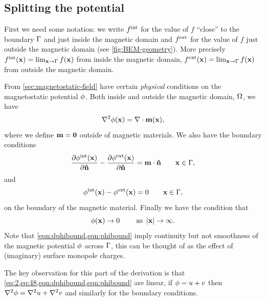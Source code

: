 \subsection{Splitting the potential}
\label{sec:problem-description}
\newcommand{\examplepot}{f}

First we need some notation: we write $\examplepot^\inte$ for the value of $\examplepot$ ``close'' to the boundary ${\Gamma}$ and just inside the magnetic domain and $\examplepot^\exte$ for the value of $\examplepot$ just outside the magnetic domain (see \cref{fig:BEM-geometry}).
More precisely $\examplepot^\inte(\xv) = \lim_{\xv \rightarrow \boundd} \examplepot(\xv)$ from inside the magnetic domain, $\examplepot^\exte(\xv) = \lim_{\xv \rightarrow \boundd} \examplepot(\xv)$ from outside the magnetic domain.

From \cref{sec:magnetostatic-field} have certain \emph{physical} conditions on the magnetostatic potential $\phi$.
Both inside and outside the magnetic domain, $\Omega$, we have
\begin{equation}
  \nabla^2 \phi(\boldsymbol{\mathrm{x}}) = \nabla \cdot \boldsymbol{\mathrm{m}}(\boldsymbol{\mathrm{x}}),
  \label{eq:2}
\end{equation}
where we define $\boldsymbol{\mathrm{m}} = \mathbf{0}$ outside of magnetic materials.
We also have the boundary conditions
\begin{equation}
  \frac{\partial \phi^{\mathrm{int}}(\boldsymbol{\mathrm{x}})}{\partial \boldsymbol{\mathrm{\hat{n}}}} - \frac{\partial \phi^{\mathrm{ext}}(\boldsymbol{\mathrm{x}})}{\partial \boldsymbol{\mathrm{\hat{n}}}} = \boldsymbol{\mathrm{m}} \cdot \boldsymbol{\mathrm{\hat{n}}} \qquad \boldsymbol{\mathrm{x}} \in {\Gamma},
  \label{eqn:dphibound}
\end{equation}
and
\begin{equation}
  \phi^{\mathrm{int}}(\boldsymbol{\mathrm{x}}) - \phi^{\mathrm{ext}}(\boldsymbol{\mathrm{x}})  = 0 \qquad \boldsymbol{\mathrm{x}} \in {\Gamma},
  \label{eqn:phibound}
\end{equation}
on the boundary of the magnetic material.
Finally we have the condition that
\begin{equation}
  \phi(\boldsymbol{\mathrm{x}}) \rightarrow 0 \qquad \text{ as } \left|{\boldsymbol{\mathrm{x}}} \right| \rightarrow \infty.
  \label{eq:48}
\end{equation}
Note that \cref{eqn:dphibound,eqn:phibound} imply continuity but not smoothness of the magnetic potential $\phi$ across ${\Gamma}$, this can be thought of as the effect of (imaginary) surface monopole charges.

The key observation for this part of the derivation is that \cref{eq:2,eq:48,eqn:dphibound,eqn:phibound} are linear, \ie if $\phi = u + v$ then $\nabla^2 \phi = \nabla^2 u + \nabla^2 v$ and similarly for the boundary conditions.

